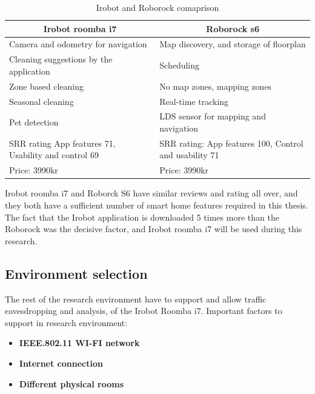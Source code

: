 \begin{table}[H]
\centering
\caption{Irobot and Roborock comaprison}
\label{tab:IrobotRoborockComparison}
\begin{tabular}{|p{}|p{}|}
\hline
\multicolumn{1}{|c|}{\textbf{Irobot roomba i7}}        & \multicolumn{1}{c|}{\textbf{Roborock s6}}                \\ \hline
Camera   and odometry for navigation                   & Map   discovery, and storage of floorplan                \\ \hline
Cleaning   suggestions by the application              & Scheduling                                               \\ \hline
Zone   based cleaning                                  & No   map zones, mapping zones                            \\ \hline
Seasonal   cleaning                                    & Real-time   tracking                                     \\ \hline
Pet   detection                                        & LDS   sensor for mapping and navigation                  \\ \hline
SRR   rating App features 71, Usability and control 69 & SRR   rating: App features 100, Control and usability 71 \\ \hline
Price:   3990kr                                        & Price:   3990kr                                          \\ \hline
\end{tabular}
\end{table}

Irobot roomba i7 and Roborck S6 have similar reviews and rating all over, and they both have a sufficient number of smart home features required in this thesis. The fact that the Irobot application is downloaded 5 times more than the Roborock was the decisive factor, and Irobot roomba i7 will be used during this research. 

\subsection{Environment selection}
The rest of the research environment have to support and allow traffic eavesdropping and analysis, of the Irobot Roomba i7.  Important factors to support in research environment:

\begin{itemize}
    \item \textbf{IEEE.802.11 WI-FI network}
    \item \textbf{Internet connection}
    \item \textbf{Different physical rooms}
\end{itemize}

